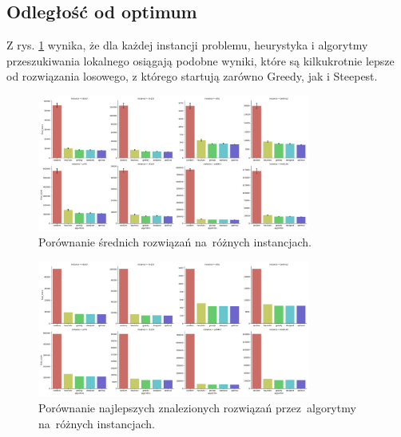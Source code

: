 \subsection{Odległość od optimum}

Z rys. \ref{fig:avg} wynika, że dla każdej instancji problemu, heurystyka i algorytmy przeszukiwania lokalnego osiągają podobne wyniki, które są kilkukrotnie lepsze od rozwiązania losowego, z którego startują zarówno Greedy, jak i Steepest.

\begin{figure}
\begin{center}
\includegraphics[width=0.8\textwidth]{graphs/algorithm_score_comparison_bar_avg.png}
\end{center}
\caption{Porównanie średnich rozwiązań na~różnych instancjach.}
\label{fig:avg}
\end{figure}

\begin{figure}
\begin{center}
\includegraphics[width=0.8\textwidth]{graphs/algorithm_score_comparison_bar_min.png}
\end{center}
\caption{Porównanie najlepszych znalezionych rozwiązań przez~algorytmy na~różnych instancjach.}
\label{fig:best}
\end{figure}

